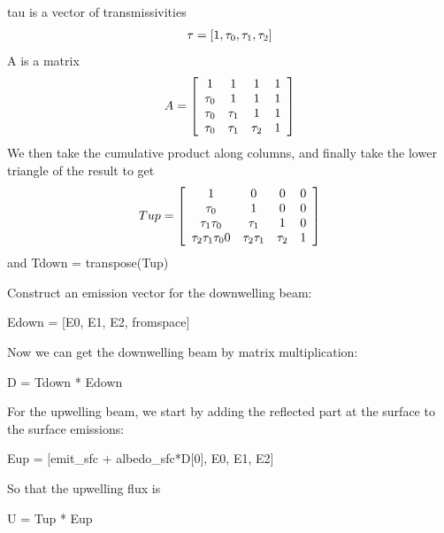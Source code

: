 \documentclass[letterpaper,10pt,english]{sphinxmanual}
\begin{document}
\begin{fulllineitems}
tau is a vector of transmissivities
\begin{gather}
\begin{split}\tau = \left[ 1, \tau_0, \tau_1, \tau_2 \right]\end{split}\notag
\end{gather}
A is a matrix
\begin{gather}
\begin{split}A= \left[ \begin{array}{cccc}
1       & 1         & 1         & 1         \\
\tau_0 & 1         & 1         & 1         \\
\tau_0 & \tau_1   & 1         & 1         \\
\tau_0 & \tau_1   & \tau_2   & 1         \\
\end{array} \right] \end{split}\notag
\end{gather}
We then take the cumulative product along columns,
and finally take the lower triangle of the result to get
\begin{gather}
\begin{split}Tup= \left[ \begin{array}{cccc}
                       1 &               0 &       0 &  0   \\ 
                 \tau_0 &               1 &       0 &  0   \\
         \tau_1 \tau_0 &         \tau_1 &       1 &  0   \\
\tau_2 \tau_1 \tau_00 & \tau_2 \tau_1 & \tau_2 &  1   \\
\end{array} \right] \end{split}\notag
\end{gather}
and Tdown = transpose(Tup)

Construct an emission vector for the downwelling beam:

Edown = {[}E0, E1, E2, fromspace{]}

Now we can get the downwelling beam by matrix multiplication:

D = Tdown * Edown

For the upwelling beam, we start by adding the reflected part
at the surface to the surface emissions:

Eup = {[}emit\_sfc + albedo\_sfc*D{[}0{]}, E0, E1, E2{]}

So that the upwelling flux is

U = Tup * Eup


\end{fulllineitems}
\end{document}
